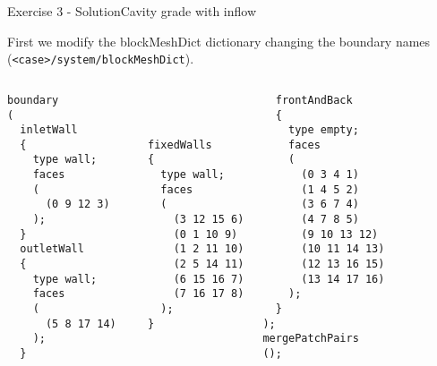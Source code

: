 \documentclass{beamer}
\begin{document}
\begin{frame}[fragile]{Exercise 3 - Solution}{Cavity grade with inflow}

First we modify the blockMeshDict dictionary changing the boundary names  (\verb|<case>/system/blockMeshDict|).\\[0.2cm]
\vspace{-0.1cm}
\begin{columns}[c]
\column{3.0cm} 

\begin{lrbox}{\mybox}
  \begin{minipage}{8em}
\begin{scriptsize}
\begin{verbatim}
boundary
(
  inletWall
  {
    type wall;
    faces
    (
      (0 9 12 3)
    );
  }
  outletWall
  {
    type wall;
    faces
    (
      (5 8 17 14)
    );
  }
\end{verbatim}
\end{scriptsize}
\end{minipage}
\end{lrbox}

\fbox{\usebox\mybox}


\column{3.0cm} 

\begin{lrbox}{\mybox}
  \begin{minipage}{8em}
    \vspace{0.2cm}
\begin{scriptsize}
\begin{verbatim}



  fixedWalls
  {
    type wall;
    faces
    (
      (3 12 15 6)
      (0 1 10 9)
      (1 2 11 10)
      (2 5 14 11)
      (6 15 16 7)
      (7 16 17 8)
    );
  }


\end{verbatim}
\end{scriptsize}
\end{minipage}
\end{lrbox}

\fbox{\usebox\mybox}


\column{3.0cm} 

\begin{lrbox}{\mybox}
  \begin{minipage}{8em}
\begin{scriptsize}
\begin{verbatim}
  frontAndBack
  {
    type empty;
    faces
    (
      (0 3 4 1)
      (1 4 5 2)
      (3 6 7 4)
      (4 7 8 5)
      (9 10 13 12)
      (10 11 14 13)
      (12 13 16 15)
      (13 14 17 16)
    );
  }
);
mergePatchPairs
();
\end{verbatim}
\end{scriptsize}
\end{minipage}
\end{lrbox}

\fbox{\usebox\mybox}

\end{columns}


\end{frame}
\end{document}
